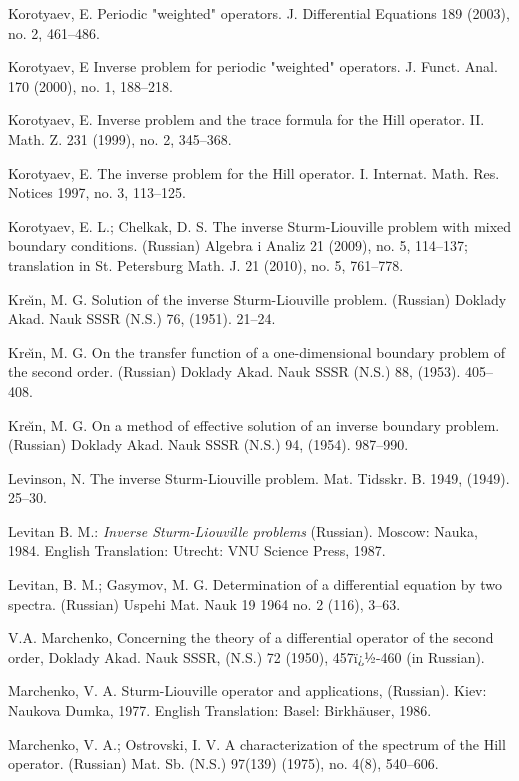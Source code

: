 \documentclass[10pt]{amsart}
\begin{document}
\begin{thebibliography}
 Korotyaev, E. Periodic "weighted" operators. J.
Differential Equations 189 (2003), no. 2, 461--486.

   Korotyaev, E Inverse problem for periodic "weighted"
operators. J. Funct. Anal. 170 (2000), no. 1, 188--218.

  Korotyaev, E. Inverse problem and the trace formula for
the Hill operator. II. Math. Z. 231 (1999), no. 2, 345--368.

  Korotyaev, E. The inverse problem for the Hill operator.
I. Internat. Math. Res. Notices 1997, no. 3, 113--125.

 Korotyaev, E. L.; Chelkak, D. S. The inverse
Sturm-Liouville problem with mixed boundary conditions. (Russian) Algebra i Analiz 21 (2009), no. 5, 114--137; translation in St. Petersburg Math. J. 21 (2010), no. 5, 761--778.

Kre\u \i n, M. G. Solution of the inverse Sturm-Liouville problem. (Russian) Doklady Akad. Nauk SSSR (N.S.) 76, (1951). 21--24.

Kre\u\i n, M. G. On the transfer function of a one-dimensional boundary problem of the second order. (Russian) Doklady Akad. Nauk SSSR (N.S.) 88, (1953). 405--408.

Kre\u\i n, M. G. On a method of effective solution of an inverse boundary problem. (Russian) Doklady Akad. Nauk SSSR (N.S.) 94, (1954). 987--990.

 Levinson, N. The inverse Sturm-Liouville problem.
Mat. Tidsskr. B. 1949, (1949). 25--30.

Levitan B. M.: {\it Inverse Sturm-Liouville problems} (Russian). Moscow: Nauka, 1984. \mbox{English} Translation: Utrecht: VNU Science Press, 1987.

  Levitan, B. M.; Gasymov, M. G. Determination of a differential equation
by two spectra. (Russian) Uspehi Mat. Nauk 19 1964 no. 2 (116), 3--63.

V.A. Marchenko, Concerning the theory of a differential operator of the second order, Doklady Akad. Nauk SSSR,
(N.S.) 72 (1950), 457ï¿½-460 (in Russian).

Marchenko, V. A.  Sturm-Liouville operator and applications, (Russian). Kiev: Naukova Dumka, 1977. English Translation: Basel: Birkh\"auser, 1986.

 Marchenko, V. A.; Ostrovski, I. V.
A characterization of the spectrum of the Hill operator.
(Russian) Mat. Sb. (N.S.) 97(139) (1975), no. 4(8), 540--606.


\end{thebibliography}
\end{document}
